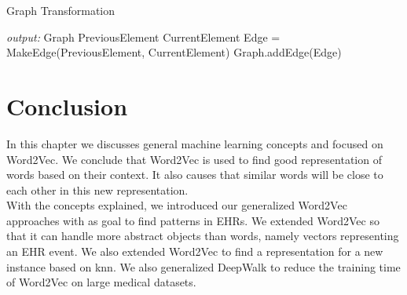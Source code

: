 \begin{algorithm}
\caption{Graph Transformation}
\label{alg:graphTrans}
\begin{algorithmic}[1]

\State \textit{output: } Graph
		\State PreviousElement
		\State CurrentElement
		\State Edge = MakeEdge(PreviousElement, CurrentElement)
		\State Graph.addEdge(Edge)
	\EndFor
\EndFor

\end{algorithmic}
\end{algorithm}

\section{Conclusion}
In this chapter we discusses general machine learning concepts and focused on Word2Vec. We conclude that Word2Vec is used to find good representation of words based on their context. It also causes that similar words will be close to each other in this new representation. \\

With the concepts explained, we introduced our generalized Word2Vec approaches with as goal to find patterns in EHRs. We extended Word2Vec so that it can handle more abstract objects than words, namely vectors representing an EHR event. We also extended Word2Vec to find a representation for a new instance based on knn. We also generalized DeepWalk to reduce the training time of Word2Vec on large medical datasets.



